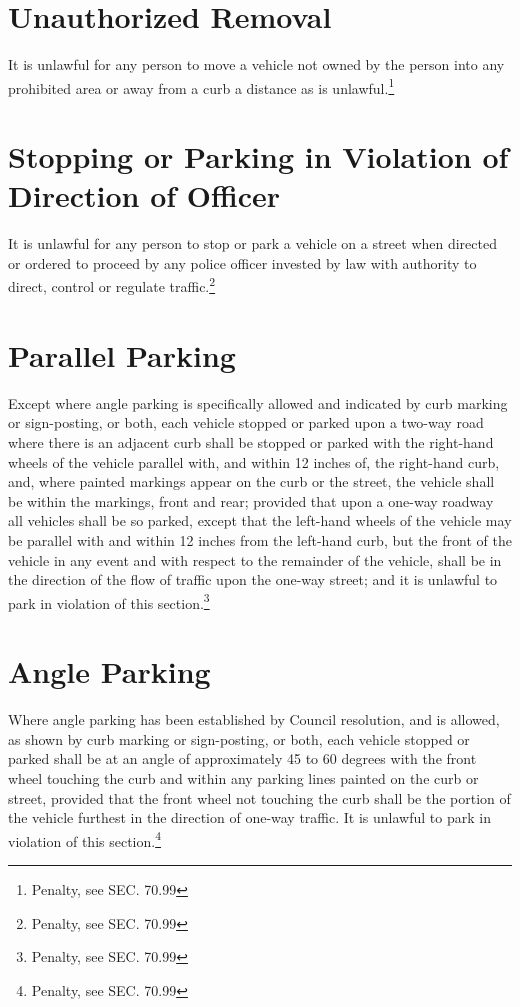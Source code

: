 \section{Unauthorized Removal}
It is unlawful for any person to move a vehicle not owned by the person into any prohibited area or away from a curb a distance as is unlawful.\footnote{Penalty, see SEC. 70.99}

\section{Stopping or Parking in Violation of Direction of Officer}
It is unlawful for any person to stop or park a vehicle on a street when directed or ordered to proceed by any police officer invested by law with authority to direct, control or regulate traffic.\footnote{Penalty, see SEC. 70.99}

\section{Parallel Parking}
Except where angle parking is specifically allowed and indicated by curb marking or sign-posting, or both, each vehicle stopped or parked upon a two-way road where there is an adjacent curb shall be stopped or parked with the right-hand wheels of the vehicle parallel with, and within 12 inches of, the right-hand curb, and, where painted markings appear on the curb or the street, the vehicle shall be within the markings, front and rear; provided that upon a one-way roadway all vehicles shall be so parked, except that the left-hand wheels of the vehicle may be parallel with and within 12 inches from the left-hand curb, but the front of the vehicle in any event and with respect to the remainder of the vehicle, shall be in the direction of the flow of traffic upon the one-way street; and it is unlawful to park in violation of this section.\footnote{Penalty, see SEC. 70.99}

\section{Angle Parking}
Where angle parking has been established by Council resolution, and is allowed, as shown by curb marking or sign-posting, or both, each vehicle stopped or parked shall be at an angle of approximately 45 to 60 degrees with the front wheel touching the curb and within any parking lines painted on the curb or street, provided that the front wheel not touching the curb shall be the portion of the vehicle furthest in the direction of one-way traffic.  It is unlawful to park in violation of this section.\footnote{Penalty, see SEC. 70.99}


